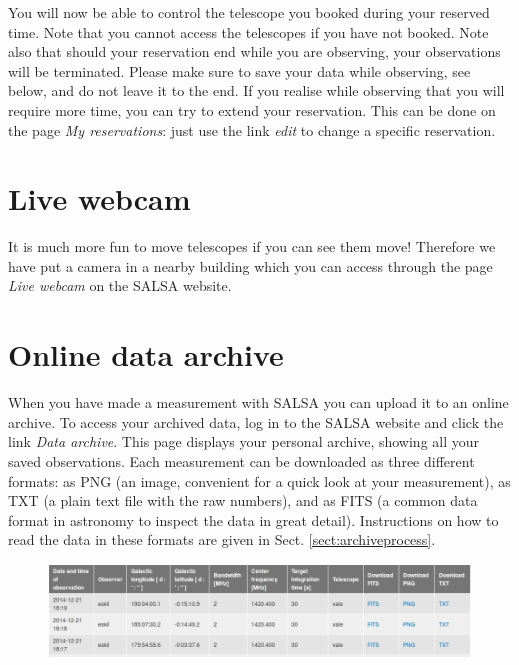 You will now be able to control the telescope you booked during your
reserved time. Note that you cannot access the telescopes if you have not
booked. Note also that should your reservation end while you are observing,
your observations will be terminated. Please make sure to save your data while
observing, see below, and do not leave it to the end. If you realise while
observing that you will require more time, you can try to extend your
reservation. This can be done on the page \emph{My reservations}: just use the
link \emph{edit} to change a specific reservation.

\section{Live webcam}
It is much more fun to move telescopes if you can see them move! Therefore
we have put a camera in a nearby building which you can access through the 
page \emph{Live webcam} on the SALSA website.

\section{Online data archive}
\label{sect:archive}
When you have made a measurement with SALSA you can upload it to an online
archive. To access your archived data, log in to the SALSA website and click
the link \emph{Data archive}. This page displays your personal archive, showing
all your saved observations.  Each measurement can be downloaded as three
different formats: as PNG (an image, convenient for a quick look at your
measurement), as TXT (a plain text file with the raw numbers), and as FITS 
(a common data format in astronomy to inspect the data in great detail).
Instructions on how to read the data in these formats are given in Sect.
\ref{sect:archiveprocess}.
\begin{figure}[h]
\centering
\includegraphics[width=\textwidth]{../figures/SALSA_archive.png}
\end{figure}
